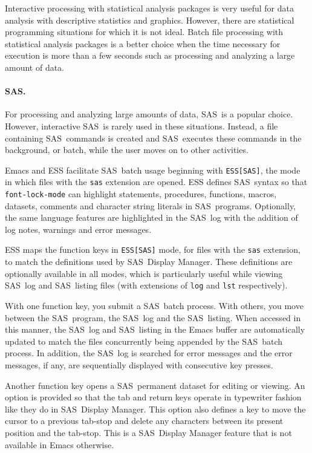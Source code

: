 \documentclass{article}
\newcommand*{\SAS}{\textsc{SAS}}
\newcommand{\stexttt}[1]{{\small\texttt{#1}}}
\begin{document}
Interactive processing with statistical analysis packages is very
useful for data analysis with descriptive statistics and graphics.
However, there are statistical programming situations for which it
is not ideal.  Batch file processing with statistical analysis
packages is a better choice when the time necessary for execution
is more than a few seconds such as processing and analyzing a
large amount of data.


\paragraph{\SAS.}
\label{sec:sas-batch}

For processing and analyzing large amounts of data, \SAS\ is a popular
choice.  However, interactive \SAS\ is rarely used in these situations.
Instead, a file containing \SAS\ commands is created and \SAS\ executes
these commands in the background, or batch, while the user moves on to 
other activities.

Emacs and ESS facilitate \SAS\ batch usage beginning
with \stexttt{ESS[SAS]},
the mode in which files with the \stexttt{sas} extension are opened.
ESS defines \SAS\ syntax so that \stexttt{font-lock-mode} can highlight
statements, procedures, functions, macros, datasets, comments and character 
string literals in \SAS\ programs.  Optionally, the same language features 
are highlighted in the \SAS\ log with the addition of log notes, warnings 
and error messages.

ESS maps the function keys in \stexttt{ESS[SAS]} mode, for files with the
\stexttt{sas} extension, to match the definitions used by \SAS\
Display Manager.  These definitions are optionally
available in all modes, which is particularly useful
while viewing \SAS\ log and \SAS\ listing files (with extensions of
\stexttt{log} and \stexttt{lst} respectively).

With one function key, you submit a \SAS\ batch process.  With others,
you move between the \SAS\ program, the \SAS\ log and the \SAS\
listing.  When accessed in this manner, the \SAS\ log and \SAS\
listing in the Emacs buffer are automatically updated to match the
files concurrently being appended by the \SAS\ batch process.  In
addition, the \SAS\ log is searched for error messages and the error
messages, if any, are sequentially displayed with consecutive key
presses.

Another function key opens a \SAS\ permanent dataset for editing or viewing.  
An option is provided so that the tab and return keys operate in typewriter 
fashion like they do in \SAS\ Display Manager.  This option also defines a 
key to move the cursor to a previous tab-stop and delete any 
characters between its present position and the tab-stop.  This is a \SAS\
Display Manager feature that is not available in Emacs otherwise. 
\end{document}
